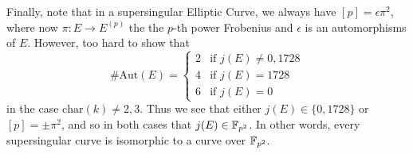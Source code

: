 Finally, note that in a supersingular Elliptic Curve, we always have $[p] = \epsilon \pi^2$, where now $\pi: E \to E^{(p)}$ the the $p$-th power Frobenius and $\epsilon$ is an automorphisms of $E$.
However, too hard to show \cite[Thm~III.10.1]{arithmetic_elliptic_curves} that
\begin{equation*}
    \#\mathrm{Aut}(E) = \begin{cases}
        2 & \text{if $j(E) \neq 0, 1728$} \\
        4 & \text{if $j(E) = 1728$} \\
        6 & \text{if $j(E) = 0$}
    \end{cases}
\end{equation*}
in the case $\mathrm{char}(k) \neq 2, 3$.
Thus we see that either $j(E) \in \{ 0, 1728 \}$ or $[p] = \pm\pi^2$, and so in both cases that $j(E) \in \mathbb{F}_{p^2}$.
In other words, every supersingular curve is isomorphic to a curve over $\mathbb{F}_{p^2}$.